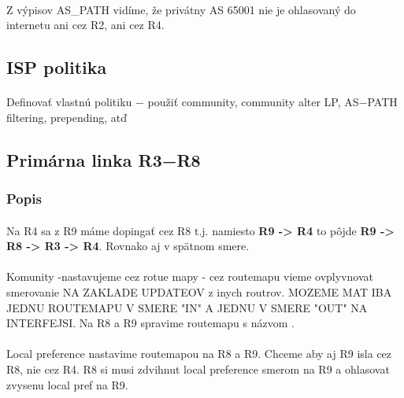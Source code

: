 \documentclass[12pt,twoside,a4paper]{report}
\begin{document}
\paragraph{}
Z výpisov AS\_PATH vidíme, že privátny AS 65001 nie je ohlasovaný do internetu ani cez R2, ani cez R4.








\newpage

\subsection{ISP politika}
\paragraph{}
Definovať vlastnú politiku − použiť community, community alter LP, AS−PATH filtering, prepending, atď

\subsection{Primárna linka R3−R8}
\subsubsection{Popis}
\paragraph{}
Na R4 sa z R9 máme dopingať cez R8 t.j. namiesto \textbf{R9 -\textgreater{} R4} to pôjde \textbf{R9 -\textgreater{} R8 -\textgreater{} R3 -\textgreater{} R4}. Rovnako aj v spätnom smere.

\paragraph{}
Komunity
-nastavujeme cez rotue mapy - cez routemapu vieme ovplyvnovat smerovanie NA ZAKLADE UPDATEOV z inych routrov. MOZEME MAT IBA JEDNU ROUTEMAPU V SMERE "IN" A JEDNU V SMERE "OUT" NA INTERFEJSI. Na R8 a R9 spravime routemapu s názvom .

\paragraph{}
Local preference nastavime routemapou na R8 a R9. Chceme aby aj R9 isla cez R8, nie cez R4. R8 si musi zdvihnut local preference smerom na R9 a ohlasovat zvysenu local pref na R9.
\end{document}
